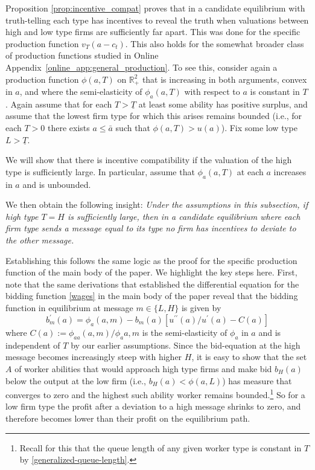 \documentclass[12pt]{article}
\begin{document}
Proposition \ref{prop:incentive_compat} proves that in a candidate equilibrium with truth-telling each type has incentives to reveal the truth when valuations between high and low type firms are sufficiently far apart. This was done for the specific production function $v_T (a-c_t)$.
This also holds for the somewhat broader class of production functions studied in Online Appendix~\ref{online_app:general_production}. To see this, consider again a production function $\phi(a,T)$ on $\mathbb{R}^2_{+}$ that is increasing in both arguments, convex in $a$, and where the semi-elasticity of $\phi_a(a,T)$ with respect to $a$ is constant in $T$. Again assume that for each $T>\underline{T}$ at least some ability has positive surplus, and assume that the lowest firm type for which this arises remains bounded (i.e., for each $T>0$ there exists $a\leq \bar{a}$ such that $\phi(a,T)>u(a)$). Fix some low type $L>\underline{T}$. 

We will show that there is incentive compatibility if the valuation of the high type is sufficiently large. In particular, assume that $\phi_a(a,T)$ at each $a$ increases in $a$ and is unbounded. 

We then obtain the following insight: \textit{ Under the assumptions in this subsection, if high type $T=H$ is sufficiently large, then in a candidate equilibrium where each firm type sends a message equal to its type no firm has incentives to deviate to the other message.}

Establishing this follows the same logic as the proof for the specific production function of the main body of the paper. We highlight the key steps here. First, note that the same derivations that established the differential equation for the bidding function \eqref{wages} in the main body of the paper reveal that the bidding function in equilibrium at message $ m\in\{L,H \} $ is given by 
\begin{equation}
    b_{m}^{\prime }(a) = \phi_a(a,m) - b_{m}(a)\left[ u^{\prime \prime }(a)/u^{\prime }(a) - C(a) \right]
\end{equation}
where $C(a):=\phi_{aa}(a,m)/\phi_a{a,m}$ is the semi-elasticity of $\phi_a$ in $a$ and is independent of $T$ by our earlier assumptions. 
Since the bid-equation at the high message becomes increasingly steep with higher $H$, it is easy to show that the set $A$ of worker abilities that would approach high type firms and make bid $b_H(a)$ below the output at the low firm (i.e., $b_H(a)<\phi(a,L)$) has measure that converges to zero and the highest such ability worker remains bounded.\footnote{Recall for this that the queue length of any given worker type is constant in $T$ by \eqref{generalized-queue-length}.} So for a low firm type the profit after a deviation to a high message shrinks to zero, and therefore becomes lower than their profit on the equilibrium path.
\end{document}
